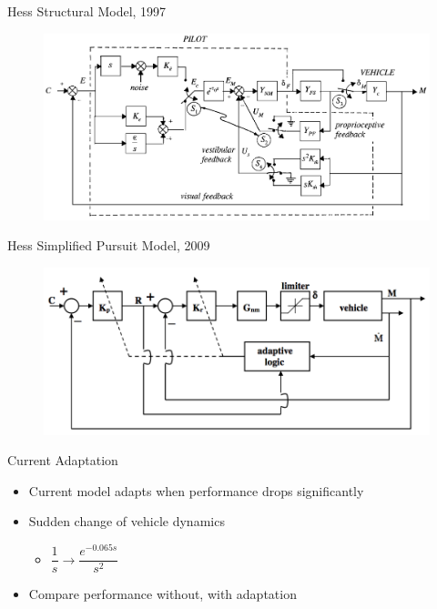\documentclass[10pt]{beamer}
\begin{document}
\begin{frame}[fragile]{Hess Structural Model, 1997~\cite{Hess1997}}
  \begin{figure}[h!]
    \begin{center}
      \includegraphics[width=\linewidth]{../img/Screen_Shot_2018-07-31_at_11.21.44_AM.png}
    \end{center}
  \end{figure}
\end{frame}

\begin{frame}[fragile]{Hess Simplified Pursuit Model, 2009~\cite{Hess2009}}
  \begin{figure}[h!]
    \begin{center}
      \includegraphics[width=\linewidth]{./../img/Screen_Shot_2018-08-09_at_4.15.24_PM.png}
    \end{center}
  \end{figure}
\end{frame}

\begin{frame}[fragile]{Current Adaptation}
  \begin{itemize}
    \setlength\itemsep{1em}
    \item Current model adapts when performance drops significantly
    \item Sudden change of vehicle dynamics
    \begin{itemize}
      \item $\dfrac{1}{s} \rightarrow \dfrac{e^{-0.065s}}{s^2}$
    \end{itemize}
    \item Compare performance without, with adaptation
  \end{itemize}
\end{frame}
\end{document}
